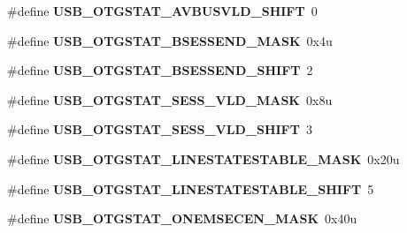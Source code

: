 \begin{DoxyCompactItemize}
\item 
\mbox{\label{group___u_s_b___register___masks_ga66258b09ad8ec5462b8594ce5ac7384c}} 
\#define {\bfseries U\+S\+B\+\_\+\+O\+T\+G\+S\+T\+A\+T\+\_\+\+A\+V\+B\+U\+S\+V\+L\+D\+\_\+\+S\+H\+I\+FT}~0
\item 
\mbox{\label{group___u_s_b___register___masks_gabcc7c3e58301a6abc07915a5deb92d39}} 
\#define {\bfseries U\+S\+B\+\_\+\+O\+T\+G\+S\+T\+A\+T\+\_\+\+B\+S\+E\+S\+S\+E\+N\+D\+\_\+\+M\+A\+SK}~0x4u
\item 
\mbox{\label{group___u_s_b___register___masks_ga6eb987e49a137057c02e8f2b26e61724}} 
\#define {\bfseries U\+S\+B\+\_\+\+O\+T\+G\+S\+T\+A\+T\+\_\+\+B\+S\+E\+S\+S\+E\+N\+D\+\_\+\+S\+H\+I\+FT}~2
\item 
\mbox{\label{group___u_s_b___register___masks_ga9158e279053f0f684c33cba2ec1e68ee}} 
\#define {\bfseries U\+S\+B\+\_\+\+O\+T\+G\+S\+T\+A\+T\+\_\+\+S\+E\+S\+S\+\_\+\+V\+L\+D\+\_\+\+M\+A\+SK}~0x8u
\item 
\mbox{\label{group___u_s_b___register___masks_ga69ae55ac7a03104ed013c34efa24ef43}} 
\#define {\bfseries U\+S\+B\+\_\+\+O\+T\+G\+S\+T\+A\+T\+\_\+\+S\+E\+S\+S\+\_\+\+V\+L\+D\+\_\+\+S\+H\+I\+FT}~3
\item 
\mbox{\label{group___u_s_b___register___masks_ga217f22f350652ae8ad2502c2baf8440b}} 
\#define {\bfseries U\+S\+B\+\_\+\+O\+T\+G\+S\+T\+A\+T\+\_\+\+L\+I\+N\+E\+S\+T\+A\+T\+E\+S\+T\+A\+B\+L\+E\+\_\+\+M\+A\+SK}~0x20u
\item 
\mbox{\label{group___u_s_b___register___masks_ga34e5a04fe2a6546a9b22a40dc1f7c543}} 
\#define {\bfseries U\+S\+B\+\_\+\+O\+T\+G\+S\+T\+A\+T\+\_\+\+L\+I\+N\+E\+S\+T\+A\+T\+E\+S\+T\+A\+B\+L\+E\+\_\+\+S\+H\+I\+FT}~5
\item 
\mbox{\label{group___u_s_b___register___masks_gaf29778bce4dce2841774778e5c566bf5}} 
\#define {\bfseries U\+S\+B\+\_\+\+O\+T\+G\+S\+T\+A\+T\+\_\+\+O\+N\+E\+M\+S\+E\+C\+E\+N\+\_\+\+M\+A\+SK}~0x40u

\end{DoxyCompactItemize}
